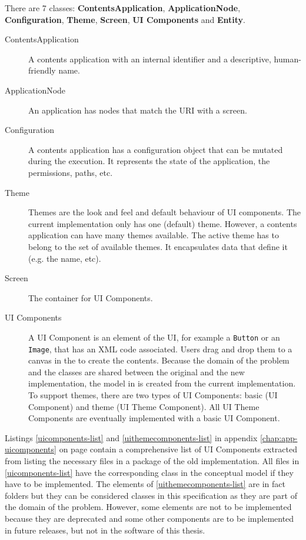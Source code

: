 There are 7 classes: \textbf{ContentsApplication}, \textbf{ApplicationNode}, \textbf{Configuration}, \textbf{Theme}, \textbf{Screen}, \textbf{UI Components} and \textbf{Entity}.

\begin{description}
\item[ContentsApplication] A contents application with an internal identifier and a descriptive, human-friendly name.
\item[ApplicationNode] An application has nodes that match the \ac{URI} with a screen.
\item[Configuration] A contents application has a configuration object that can be mutated during the execution.
It represents the state of the application, the permissions, paths, etc.
\item[Theme] Themes are the look and feel and default behaviour of \ac{UI} components.
The current implementation only has one (default) theme.
However, a contents application can have many themes available.
The active theme has to belong to the set of available themes. 
It encapsulates data that define it (e.g. the name, etc).
\item[Screen] The container for UI Components.
\item[UI Components] A UI Component is an element of the \ac{UI}, for example a \texttt{Button} or an \texttt{Image}, that has an \ac{XML} code associated.
Users drag and drop them to a canvas in the \se to create the contents. 
Because the domain of the problem and the classes are shared between the original and the new implementation, the model in  is created from the current implementation.
To support themes, there are two types of UI Components: basic (UI Component) and theme (UI Theme Component).
All UI Theme Components are eventually implemented with a basic UI Component.
\end{description}

Listings \ref{uicomponents-list} and \ref{uithemecomponents-list} in appendix \ref{chap:app-uicomponents} on page \pageref{chap:app-uicomponents} contain a comprehensive list of UI Components extracted from listing the necessary files in a package of the old implementation.
All files in \ref{uicomponents-list} have the corresponding class in the conceptual model if they have to be implemented.
The elements of \ref{uithemecomponents-list} are in fact folders but they can be considered classes in this specification as they are part of the domain of the problem.
However, some elements are not to be implemented because they are deprecated and some other components are to be implemented in future releases, but not in the software of this thesis.

